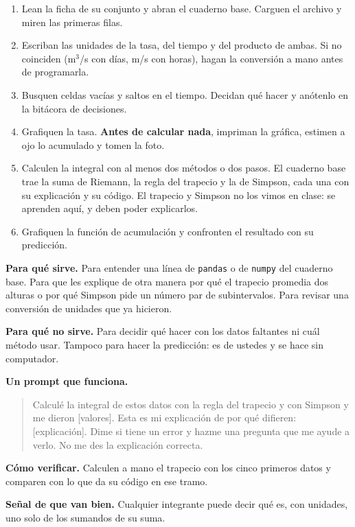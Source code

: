 \documentclass[12pt,letterpaper]{article}
\newcommand{\prompt}[1]{\begin{quote}\small\ttfamily #1\end{quote}}
\begin{document}
\begin{enumerate}[label=\arabic*.,itemsep=0.2em]
    \item Lean la ficha de su conjunto y abran el cuaderno base. Carguen el archivo y miren las primeras filas.
    \item Escriban las unidades de la tasa, del tiempo y del producto de ambas. Si no coinciden (m$^3$/s con días, m/s con horas), hagan la conversión a mano antes de programarla.
    \item Busquen celdas vacías y saltos en el tiempo. Decidan qué hacer y anótenlo en la bitácora de decisiones.
    \item Grafiquen la tasa. \textbf{Antes de calcular nada}, impriman la gráfica, estimen a ojo lo acumulado y tomen la foto.
    \item Calculen la integral con al menos dos métodos o dos pasos. El cuaderno base trae la suma de Riemann, la regla del trapecio y la de Simpson, cada una con su explicación y su código. El trapecio y Simpson no los vimos en clase: se aprenden aquí, y deben poder explicarlos.
    \item Grafiquen la función de acumulación y confronten el resultado con su predicción.
\end{enumerate}

\begin{cajaia}
\textbf{Para qué sirve.} Para entender una línea de \texttt{pandas} o de \texttt{numpy} del cuaderno base. Para que les explique de otra manera por qué el trapecio promedia dos alturas o por qué Simpson pide un número par de subintervalos. Para revisar una conversión de unidades que ya hicieron.

\textbf{Para qué no sirve.} Para decidir qué hacer con los datos faltantes ni cuál método usar. Tampoco para hacer la predicción: es de ustedes y se hace sin computador.

\textbf{Un prompt que funciona.}
\prompt{Calculé la integral de estos datos con la regla del trapecio y con Simpson y me dieron [valores]. Esta es mi explicación de por qué difieren: [explicación]. Dime si tiene un error y hazme una pregunta que me ayude a verlo. No me des la explicación correcta.}

\textbf{Cómo verificar.} Calculen a mano el trapecio con los cinco primeros datos y comparen con lo que da su código en ese tramo.
\end{cajaia}

\textbf{Señal de que van bien.} Cualquier integrante puede decir qué es, con unidades, uno solo de los sumandos de su suma.
\end{document}
